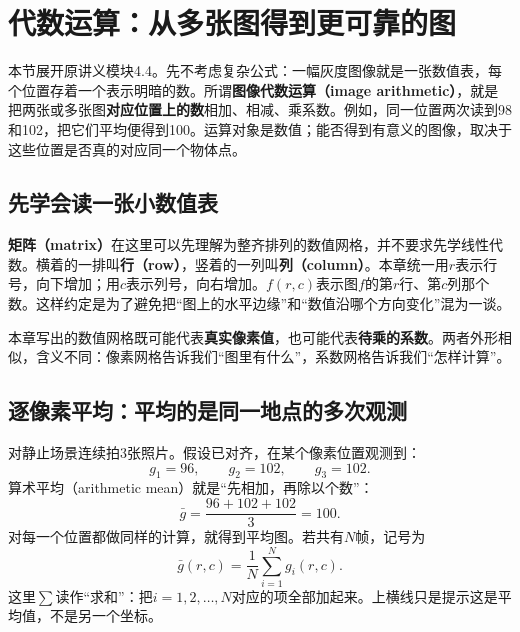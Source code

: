 \section{代数运算：从多张图得到更可靠的图}
\label{sec:algebra-beginner}
本节展开原讲义模块4.4。先不考虑复杂公式：一幅灰度图像就是一张数值表，每个位置存着一个表示明暗的数。所谓\textbf{图像代数运算（image arithmetic）}，就是把两张或多张图\textbf{对应位置上的数}相加、相减、乘系数。例如，同一位置两次读到98和102，把它们平均便得到100。运算对象是数值；能否得到有意义的图像，取决于这些位置是否真的对应同一个物体点。

\subsection{先学会读一张小数值表}
\textbf{矩阵（matrix）}在这里可以先理解为整齐排列的数值网格，并不要求先学线性代数。横着的一排叫\textbf{行（row）}，竖着的一列叫\textbf{列（column）}。本章统一用$r$表示行号，向下增加；用$c$表示列号，向右增加。$f(r,c)$表示图$f$的第$r$行、第$c$列那个数。这样约定是为了避免把“图上的水平边缘”和“数值沿哪个方向变化”混为一谈。
\begin{center}
\end{center}
本章写出的数值网格既可能代表\textbf{真实像素值}，也可能代表\textbf{待乘的系数}。两者外形相似，含义不同：像素网格告诉我们“图里有什么”，系数网格告诉我们“怎样计算”。

\subsection{逐像素平均：平均的是同一地点的多次观测}
对静止场景连续拍3张照片。假设已对齐，在某个像素位置观测到：
\[
  g_1=96,\qquad g_2=102,\qquad g_3=102.
\]
算术平均（arithmetic mean）就是“先相加，再除以个数”：
\[
  \bar g=\frac{96+102+102}{3}=100.
\]
对每一个位置都做同样的计算，就得到平均图。若共有$N$帧，记号为
\[
  \bar g(r,c)=\frac{1}{N}\sum_{i=1}^{N}g_i(r,c).
\]
这里$\sum$读作“求和”：把$i=1,2,\ldots,N$对应的项全部加起来。上横线只是提示这是平均值，不是另一个坐标。


